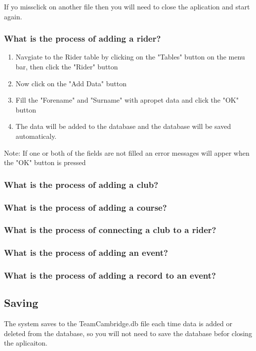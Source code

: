 If yo missclick on another file then you will need to close the aplication and start again.

\subsubsection{What is the process of adding a rider?}
\begin{enumerate}
\item Navgiate to the Rider table by clicking on the "Tables" button on the menu bar, then click the "Rider" button
\item Now click on the "Add Data" button
\item Fill the "Forename" and "Surname" with apropet data and click the "OK" button
\item The data will be added to the database and the database will be saved automaticaly.
\end{enumerate}

Note: If one or both of the fields are not filled an error messages will apper when the "OK" button is pressed
\subsubsection{What is the process of adding a club?}

\subsubsection{What is the process of adding a course?}

\subsubsection{What is the process of connecting a club to a rider?}

\subsubsection{What is the process of adding an event?}

\subsubsection{What is the process of adding a record to an event?}



\subsection{Saving}
The system saves to the TeamCambridge.db file each time data is added or deleted from the database, so you will not need to save the database befor closing the aplicaiton.
